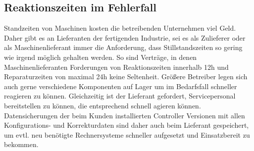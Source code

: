 \subsection{Reaktionszeiten im Fehlerfall}

Standzeiten von Maschinen kosten die betreibenden Unternehmen viel Geld. Daher gibt es an Lieferanten der fertigenden Industrie, sei es als Zulieferer oder als Maschinenlieferant immer die Anforderung, dass Stillstandszeiten so gering wie irgend möglich gehalten werden. So sind Verträge, in denen Maschinenlieferanten Forderungen von Reaktionszeiten innerhalb 12h und Reparaturzeiten von maximal 24h keine Seltenheit. Größere Betreiber legen sich auch gerne verschiedene Komponenten auf Lager um im Bedarfsfall schneller reagieren zu können. Gleichzeitig ist der Lieferant gefordert, Servicepersonal bereitstellen zu können, die entsprechend schnell agieren können. Datensicherungen der beim Kunden installierten Controller Versionen mit allen Konfigurations- und Korrekturdaten sind daher auch beim Lieferant gespeichert, um evtl. neu benötigte Rechnersysteme schneller aufgesetzt und Einsatzbereit zu bekommen.
